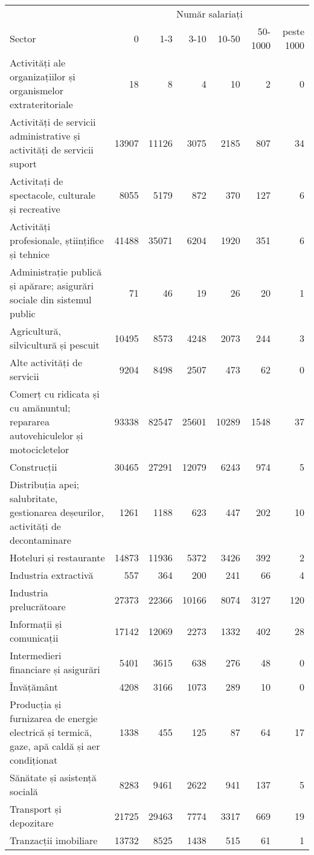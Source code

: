 \documentclass[
]{book}
\begin{document}
\captionsetup[table]{labelformat=empty,skip=1pt}
\begin{longtable}{lrrrrrr}
\toprule
& \multicolumn{6}{c}{Număr salariați} \\ 
 \cmidrule(lr){2-7}
Sector & 0 & 1-3 & 3-10 & 10-50 & 50-1000 & peste 1000 \\ 
\midrule
Activități ale organizațiilor și organismelor extrateritoriale & 18 & 8 & 4 & 10 & 2 & 0 \\ 
Activități de servicii administrative și activități de servicii suport & 13907 & 11126 & 3075 & 2185 & 807 & 34 \\ 
Activitați de spectacole, culturale și recreative & 8055 & 5179 & 872 & 370 & 127 & 6 \\ 
Activități profesionale, științifice și tehnice & 41488 & 35071 & 6204 & 1920 & 351 & 6 \\ 
Administrație publică și apărare; asigurări sociale din sistemul public & 71 & 46 & 19 & 26 & 20 & 1 \\ 
Agricultură, silvicultură și pescuit & 10495 & 8573 & 4248 & 2073 & 244 & 3 \\ 
Alte activități de servicii & 9204 & 8498 & 2507 & 473 & 62 & 0 \\ 
Comerț cu ridicata și cu amănuntul; repararea autovehiculelor și motocicletelor & 93338 & 82547 & 25601 & 10289 & 1548 & 37 \\ 
Construcții & 30465 & 27291 & 12079 & 6243 & 974 & 5 \\ 
Distribuția apei; salubritate, gestionarea deșeurilor, activități de decontaminare & 1261 & 1188 & 623 & 447 & 202 & 10 \\ 
Hoteluri și restaurante & 14873 & 11936 & 5372 & 3426 & 392 & 2 \\ 
Industria extractivă & 557 & 364 & 200 & 241 & 66 & 4 \\ 
Industria prelucrătoare & 27373 & 22366 & 10166 & 8074 & 3127 & 120 \\ 
Informații și comunicații & 17142 & 12069 & 2273 & 1332 & 402 & 28 \\ 
Intermedieri financiare și asigurări & 5401 & 3615 & 638 & 276 & 48 & 0 \\ 
Învățământ & 4208 & 3166 & 1073 & 289 & 10 & 0 \\ 
Producția și furnizarea de energie electrică și termică, gaze, apă caldă și aer condiționat & 1338 & 455 & 125 & 87 & 64 & 17 \\ 
Sănătate și asistență socială & 8283 & 9461 & 2622 & 941 & 137 & 5 \\ 
Transport și depozitare & 21725 & 29463 & 7774 & 3317 & 669 & 19 \\ 
Tranzacții imobiliare & 13732 & 8525 & 1438 & 515 & 61 & 1 \\ 
\bottomrule
\end{longtable}
\end{document}

